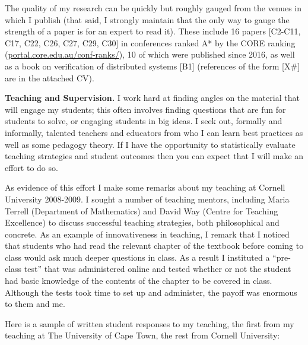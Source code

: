 \documentclass[10,a4paper,sans]{moderncv}
\begin{document}
The quality of my research can be quickly but roughly gauged from the venues in which I publish (that said, I strongly maintain that the only way to gauge the strength of a paper is for an expert to read it). These include 16 papers [C2-C11, C17, C22, C26, C27, C29, C30] in conferences ranked A* by the CORE ranking (\url{portal.core.edu.au/conf-ranks/}), 10 of which were published since 2016, as well as a book on verification of distributed systems [B1] (references of the form [X\#] are in the attached CV).


\textbf{Teaching and Supervision.}
I work hard at finding angles on the material that will engage my students; this
often involves finding questions that are fun for students to solve, or engaging students 
in big ideas. I seek out, formally and informally, talented teachers and educators from who I can learn best practices as well as some pedagogy theory. 
If I have the opportunity to statistically evaluate teaching strategies and student outcomes then you can expect that I will make an effort to do so.

As evidence of this effort I make some remarks about my teaching at Cornell University 2008-2009.
I sought a number of teaching mentors, including Maria Terrell (Department of Mathematics) and David Way (Centre for Teaching Excellence) 
to discuss successful teaching strategies, both philosophical and concrete. As an example of innovativeness in teaching, I remark that I noticed that students who had read the relevant chapter of the textbook before coming to class would ask much deeper questions in class. 
As a result I instituted a ``pre-class test'' that was administered online and tested whether or not the student had basic knowledge of the contents of the chapter to be covered in class. Although the tests took time to set up and administer, the payoff was enormous to them and me. 



Here is a sample of written student responses to my teaching, the first from my teaching at The University of Cape Town, the rest from Cornell University:

\vspace{1mm}
\end{document}
